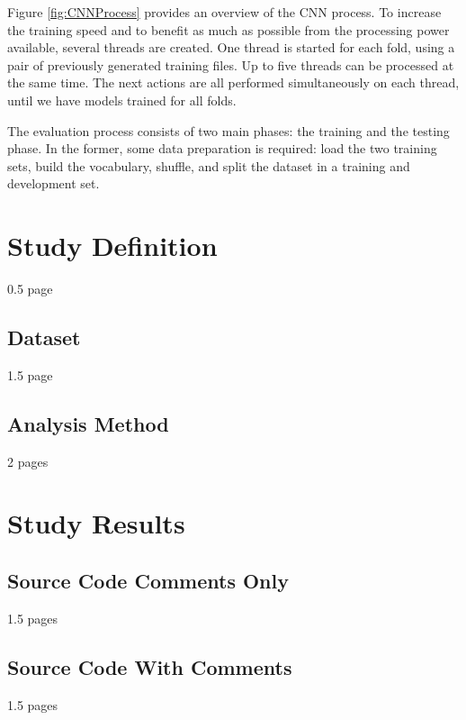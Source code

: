 Figure \ref{fig:CNNProcess} provides an overview of the CNN process. To increase the training speed and to benefit as much as possible from the processing power available, several threads are created. One thread is started for each fold, using a pair of previously generated training files. Up to five threads can be processed at the same time. The next actions are all performed simultaneously on each thread, until we have models trained for all folds. 

The evaluation process consists of two main phases: the training and the testing phase. In the former, some data preparation is required: load the two training sets, build the vocabulary, shuffle, and split the dataset in a training and development set. 

\section{Study Definition}

0.5 page

\subsection{Dataset}

1.5 page

\subsection{Analysis Method}

2 pages

\section{Study Results}

\subsection{Source Code Comments Only}

1.5 pages 


\subsection{Source Code With Comments}

1.5 pages

